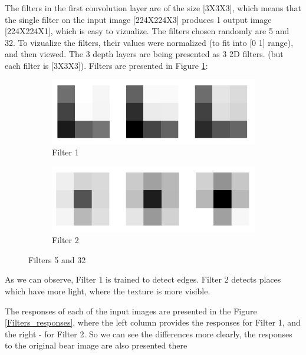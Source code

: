 \documentclass[a4paper]{iacas}
\begin{document}
\subsubsection{}
The filters in the first convolution layer are of the size [3X3X3], which means that the single filter on the input image [224X224X3] produces 1 output image [224X224X1], which is easy to vizualize.
\newline
The filters chosen randomly are 5 and 32. To vizualize the filters, their values were normalized (to fit into [0 1] range), and then viewed. The 3 depth layers are being presented as 3 2D filters. (but each filter is [3X3X3]). Filters are presented in Figure \ref{Filters}:

\vskip 0.1in
\begin{figure}[!htbp]
	\begin{subfigure}{0.6\linewidth}
		\centering
		\includegraphics[width=\linewidth]{imgs/filter_1.png}
		\caption{Filter 1}
	\end{subfigure}
	\vskip 0.1in
	\begin{subfigure}{0.6\linewidth}
		\centering
		\includegraphics[width=\linewidth]{imgs/filter_2.png}
		\caption{Filter 2}
	\end{subfigure}
	\caption{Filters 5 and 32}
	\label{Filters}
\end{figure}
\vskip 0.1in

As we can observe, Filter 1 is trained to detect edges. Filter 2 detects places which have more light, where the texture is more visible.

The responses of each of the input images are presented in the Figure \ref{Filters_responses}, where the left column provides the responses for Filter 1, and the right - for Filter 2. So we can see the differences more clearly, the responses to the original bear image are also presented there
\end{document}
